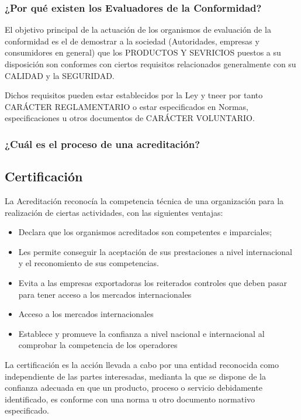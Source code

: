 \subsubsection{¿Por qué existen los Evaluadores de la Conformidad?}
El objetivo principal de la actuación de los organismos de evaluación de la conformidad es el de demostrar a la sociedad (Autoridades, empresas y consumidores en general) que los PRODUCTOS Y SEVRICIOS puestos a su disposición son conformes con ciertos requisitos relacionados generalmente con su CALIDAD y la SEGURIDAD.

Dichos requisitos pueden estar establecidos por la Ley y tneer por tanto CARÁCTER REGLAMENTARIO o estar especificados en Normas, especificaciones u otros documentos de CARÁCTER VOLUNTARIO.

\subsubsection{¿Cuál es el proceso de una acreditación?}


\subsection{Certificación}
La Acreditación reconocía la competencia técnica de una organización para la realización de ciertas actividades, con las siguientes ventajas:
\begin{itemize}
    \item Declara que los organismos acreditados son competentes e imparciales;
    \item Les permite conseguir la aceptación de sus prestaciones a nivel internacional y el reconomiento de sus competencias.
    \item Evita a las empresas exportadoras los reiterados controles que deben pasar para tener acceso a los mercados internacionales
    \item Acceso a los mercados internacionales
    \item Establece y promueve la confianza a nivel nacional e internacional al comprobar la competencia de los operadores
\end{itemize}

La certificación es la acción llevada a cabo por una entidad reconocida como independiente de las partes interesadas, medianta la que se dispone de la confianza adecuada en que un producto, proceso o servicio debidamente identificado, es conforme con una norma u otro documento normativo especificado.

